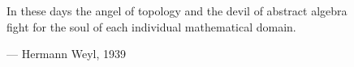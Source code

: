 \begin{flushright}
\begin{hangleftquote}{\QENOpen}{\QENClose}
In these days the angel of topology and the devil of abstract algebra\\
fight for the soul of each individual mathematical domain.
\end{hangleftquote}
\par\smallskip
\normalfont — Hermann Weyl, 1939
\end{flushright}
